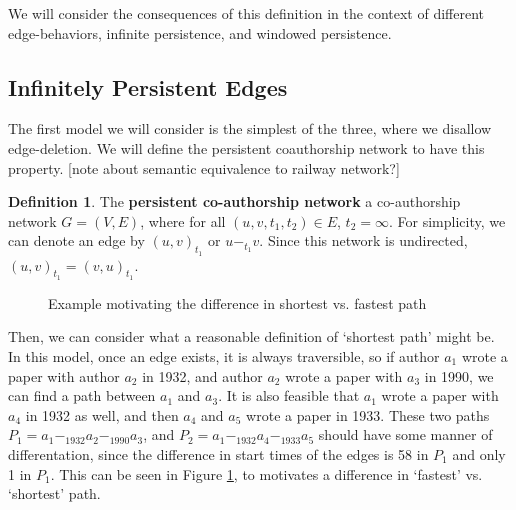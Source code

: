 \documentclass{article}
\theoremstyle{definition}
\newtheorem{defn}[thm]{Definition}
\numberwithin{thm}{subsection}
\begin{document}
We will consider the consequences of this definition in the context of different
edge-behaviors, infinite persistence, and windowed persistence.

\subsection{Infinitely Persistent Edges}

The first model we will consider is the simplest of the three, where we disallow
edge-deletion. We will define the persistent coauthorship network to have this
property. [note about semantic equivalence to railway network?]

\begin{defn}
  The \textbf{persistent co-authorship network} a co-authorship network $G = (V,E)$,
  where for all $(u,v,t_1,t_2) \in E$, $t_2 = \infty$. For simplicity, we can
  denote an edge by $(u,v)_{t_1}$ or $u -_{t_1} v$. Since this network is
  undirected, $(u,v)_{t_1} = (v,u)_{t_1}$.
\end{defn}

\begin{figure}[ht] \centering
  \caption{Example motivating the difference in shortest vs. fastest path}
  \label{fig:infinite_edge_ex}
\end{figure}

Then, we can consider what a reasonable definition of `shortest path' might be.
In this model, once an edge exists, it is always traversible, so if author
$a_1$ wrote a paper with author $a_2$ in 1932, and author $a_2$ wrote a paper with
$a_3$ in 1990, we can find a path between $a_1$ and $a_3$.  It is also feasible
that $a_1$ wrote a paper with $a_4$ in 1932 as well, and then $a_4$ and $a_5$
wrote a paper in 1933. These two paths $P_1 = a_1 -_{1932} a_2 -_{1990} a_3$, and
$P_2 = a_1 -_{1932} a_4 -_{1933} a_5$ should have some manner of differentation,
since the difference in start times of the edges is 58 in $P_1$ and only 1
in $P_1$. This can be seen in Figure \ref{fig:infinite_edge_ex}, to motivates a
difference in `fastest' vs. `shortest' path.
\end{document}
